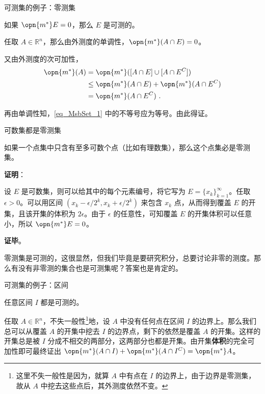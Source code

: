 \begin{example}{可测集的例子：零测集}

如果 $\opn{m^*}E=0$，那么 $E$ 是可测的。

任取 $A\in\mathbb{R}^n$，那么由外测度的单调性，$\opn{m^*}(A\cap E)=0$。

又由外测度的次可加性，
\begin{equation}\label{eq_MsbSet_1}
\begin{aligned}
\opn{m^*}(A)&=\opn{m^*}([A\cap E]\cup[A\cap E^C])\\
&\leq \opn{m^*}(A\cap E)+\opn{m^*}(A\cap E^C)\\
&=\opn{m^*}(A\cap E^C)~.
\end{aligned}
\end{equation}

再由单调性知，\autoref{eq_MsbSet_1} 中的不等号应为等号。由此得证。

\end{example}

\begin{theorem}{可数集都是零测集}\label{the_MsbSet_4}

如果一个点集中只含有至多可数个点（比如有理数集），那么这个点集必是零测集。

\end{theorem}

\textbf{证明}：

设 $E$ 是可数集，则可以给其中的每个元素编号，将它写为 $E=\{x_k\}_{k=1}^\infty$。任取 $\epsilon>0$。可以用区间 $(x_k-\epsilon/2^k, x_k+\epsilon/2^k)$ 来包含 $x_k$ 点，从而得到覆盖 $E$ 的开集，且该开集的体积为 $2\epsilon$。由于 $\epsilon$ 的任意性，可知覆盖 $E$ 的开集体积可以任意小，所以 $\opn{m^*}E=0$。

\textbf{证毕}。

零测集是可测的，这很显然，但我们毕竟是要研究积分，总要讨论非零的测度。那么有没有非零测的集合也是可测集呢？答案也是肯定的。

\begin{example}{可测集的例子：区间}\label{ex_MsbSet_1}

任意区间 $I$ 都是可测的。

任取 $A\in\mathbb{R}^n$，不失一般性\footnote{这里不失一般性是因为，就算 $A$ 中有点在 $I$ 的边界上，由于边界是零测集，故从 $A$ 中挖去这些点后，其外测度依然不变。}地，设 $A$ 中没有任何点在区间 $I$ 的边界上。那么我们总可以从覆盖 $A$ 的开集中挖去 $I$ 的边界点，剩下的依然是覆盖 $A$ 的开集。这样的开集总是被 $I$ 分成不相交的两部分，这两部分也都是开集。由开集\textbf{体积}的完全可加性即可最终证出 $\opn{m^*}(A\cap I)+\opn{m^*}(A\cap I^C)=\opn{m^*}A$。

\end{example}

